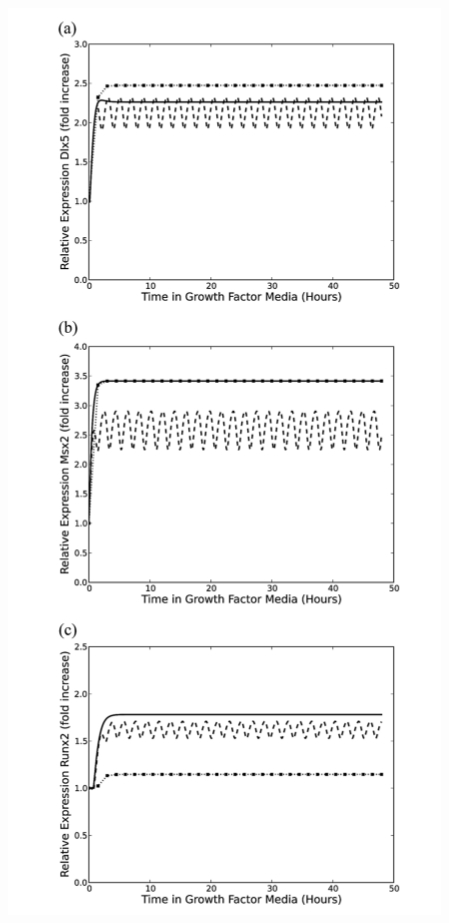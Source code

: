 \documentclass[handout]{beamer}
\begin{document}
\begin{frame}
\begin{center}
	\includegraphics[scale=0.26]{oscillations.jpg}
\end{center}
\end{frame}
\end{document}
